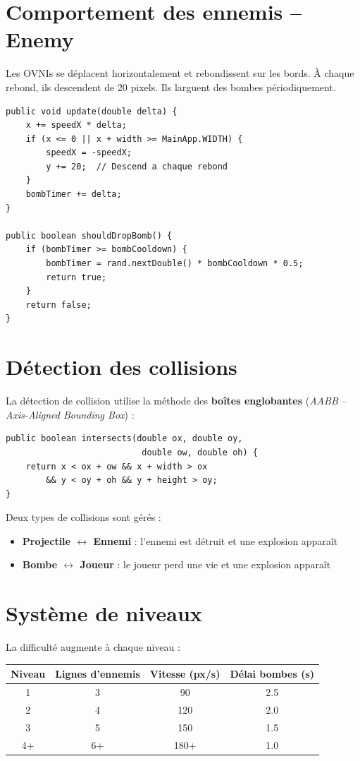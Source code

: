 \documentclass[12pt,a4paper]{report}
\begin{document}
\section{Comportement des ennemis -- Enemy}
Les OVNIs se déplacent horizontalement et rebondissent sur les bords. À chaque rebond, ils descendent de 20 pixels. Ils larguent des bombes périodiquement.

\begin{lstlisting}[caption={Enemy.java -- Déplacement et bombes}]
public void update(double delta) {
    x += speedX * delta;
    if (x <= 0 || x + width >= MainApp.WIDTH) {
        speedX = -speedX;
        y += 20;  // Descend a chaque rebond
    }
    bombTimer += delta;
}

public boolean shouldDropBomb() {
    if (bombTimer >= bombCooldown) {
        bombTimer = rand.nextDouble() * bombCooldown * 0.5;
        return true;
    }
    return false;
}
\end{lstlisting}

\section{Détection des collisions}
La détection de collision utilise la méthode des \textbf{boîtes englobantes} (\textit{AABB -- Axis-Aligned Bounding Box}) :

\begin{lstlisting}[caption={Méthode de détection de collision}]
public boolean intersects(double ox, double oy,
                           double ow, double oh) {
    return x < ox + ow && x + width > ox
        && y < oy + oh && y + height > oy;
}
\end{lstlisting}

Deux types de collisions sont gérés :
\begin{itemize}[leftmargin=1.5cm]
  \item \textbf{Projectile $\leftrightarrow$ Ennemi} : l'ennemi est détruit et une explosion apparaît
  \item \textbf{Bombe $\leftrightarrow$ Joueur} : le joueur perd une vie et une explosion apparaît
\end{itemize}

\section{Système de niveaux}
La difficulté augmente à chaque niveau :

\begin{center}
\begin{tabular}{|c|c|c|c|}
\hline
\textbf{Niveau} & \textbf{Lignes d'ennemis} & \textbf{Vitesse (px/s)} & \textbf{Délai bombes (s)} \\
\hline
1 & 3 & 90 & 2.5 \\
2 & 4 & 120 & 2.0 \\
3 & 5 & 150 & 1.5 \\
4+ & 6+ & 180+ & 1.0 \\
\hline
\end{tabular}
\end{center}
\end{document}
